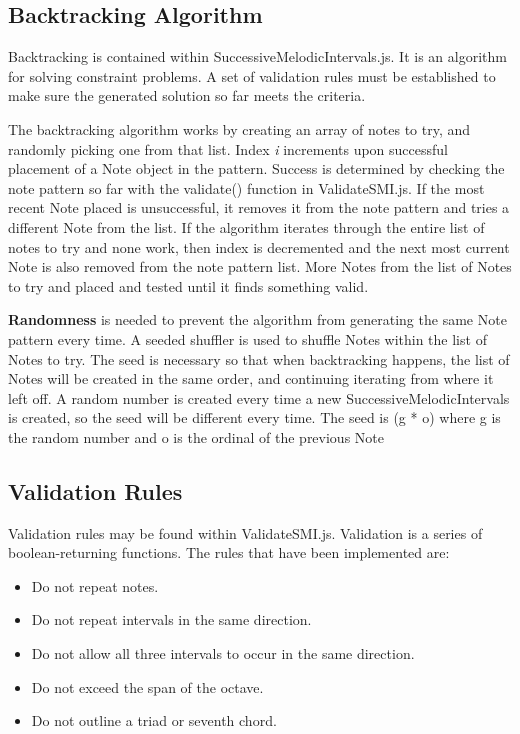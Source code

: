 \documentclass{article}
\begin{document}
\subsection{Backtracking Algorithm}
Backtracking is contained within SuccessiveMelodicIntervals.js. It is an algorithm for solving constraint problems. A set of validation rules must be established to make sure the generated solution so far meets the criteria. 

The backtracking algorithm works by creating an array of notes to try, and randomly picking one from that list. Index \textit{i} increments upon successful placement of a Note object in the pattern. Success is determined by checking the note pattern so far with the validate() function in ValidateSMI.js. If the most recent Note placed is unsuccessful, it removes it from the note pattern and tries a different Note from the list. If the algorithm iterates through the entire list of notes to try and none work, then index is decremented and the next most current Note is also removed from the note pattern list. More Notes from the list of Notes to try and placed and tested until it finds something valid.

\textbf{Randomness} is needed to prevent the algorithm from generating the same Note pattern every time. A seeded shuffler is used to shuffle Notes within the list of Notes to try. The seed is necessary so that when backtracking happens, the list of Notes will be created in the same order, and continuing iterating from where it left off. A  random number is created every time a new SuccessiveMelodicIntervals is created, so the seed will be different every time. The seed is (g * o) where g is the random number and o is the ordinal of the previous Note
\subsection{Validation Rules}
Validation rules may be found within ValidateSMI.js. Validation is a series of boolean-returning functions. The rules that have been implemented are:
\begin{itemize}
    \item Do not repeat notes.
    \item Do not repeat intervals in the same direction.
    \item Do not allow all three intervals to occur in the same direction.
    \item Do not exceed the span of the octave.
    \item Do not outline a triad or seventh chord.
\end{itemize}
\end{document}
